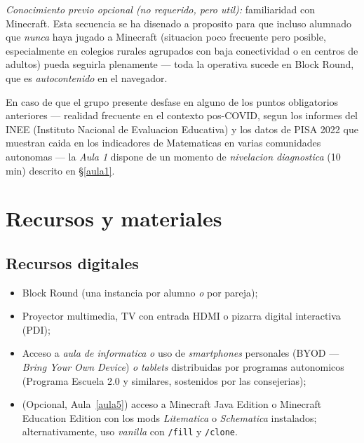 \documentclass[12pt,a4paper]{scrartcl}
\newcommand{\cmd}[1]{\textcolor{earth}{\texttt{\small #1}}}
\begin{document}
\emph{Conocimiento previo opcional (no requerido, pero util):} familiaridad con Minecraft. Esta secuencia se ha disenado a proposito para que incluso alumnado que \emph{nunca} haya jugado a Minecraft (situacion poco frecuente pero posible, especialmente en colegios rurales agrupados con baja conectividad o en centros de adultos) pueda seguirla plenamente --- toda la operativa sucede en Block Round, que es \emph{autocontenido} en el navegador.

En caso de que el grupo presente desfase en alguno de los puntos obligatorios anteriores --- realidad frecuente en el contexto pos-COVID, segun los informes del INEE (Instituto Nacional de Evaluacion Educativa) y los datos de PISA 2022 que muestran caida en los indicadores de Matematicas en varias comunidades autonomas --- la \emph{Aula 1} dispone de un momento de \emph{nivelacion diagnostica} (10 min) descrito en §\ref{aula1}.

\section{Recursos y materiales}\label{sec:recursos}

\subsection{Recursos digitales}
\begin{itemize}[leftmargin=1.3em,itemsep=0.15em,topsep=0.3em]
  \item Block Round (una instancia por alumno \emph{o} por pareja);
  \item Proyector multimedia, TV con entrada HDMI o pizarra digital interactiva (PDI);
  \item Acceso a \emph{aula de informatica} \emph{o} uso de \emph{smartphones} personales (BYOD --- \emph{Bring Your Own Device}) \emph{o} \emph{tablets} distribuidas por programas autonomicos (Programa Escuela 2.0 y similares, sostenidos por las consejerias);
  \item (Opcional, Aula~\ref{aula5}) acceso a Minecraft Java Edition o Minecraft Education Edition con los mods \emph{Litematica} o \emph{Schematica} instalados; alternativamente, uso \emph{vanilla} con \cmd{/fill} y \cmd{/clone}.
\end{itemize}
\end{document}
